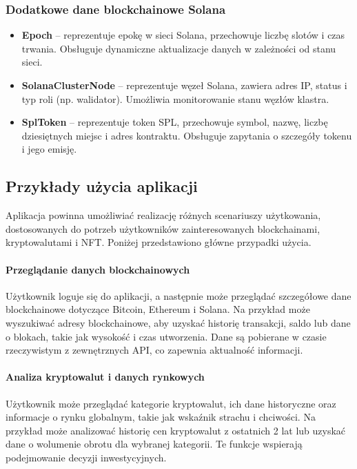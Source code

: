 \subsubsection{Dodatkowe dane blockchainowe Solana}
\begin{itemize}
\item \textbf{Epoch} -- reprezentuje epokę w sieci Solana, przechowuje liczbę slotów i czas trwania. Obsługuje dynamiczne aktualizacje danych w zależności od stanu sieci.
\item \textbf{SolanaClusterNode} -- reprezentuje węzeł Solana, zawiera adres IP, status i typ roli (np. walidator). Umożliwia monitorowanie stanu węzłów klastra.
\item \textbf{SplToken} -- reprezentuje token SPL, przechowuje symbol, nazwę, liczbę dziesiętnych miejsc i adres kontraktu. Obsługuje zapytania o szczegóły tokenu i jego emisję.
\end{itemize}

\subsection{Przykłady użycia aplikacji}
Aplikacja powinna umożliwiać realizację różnych scenariuszy użytkowania, dostosowanych do potrzeb użytkowników zainteresowanych blockchainami, kryptowalutami i NFT. Poniżej przedstawiono główne przypadki użycia.

\paragraph{Przeglądanie danych blockchainowych}
Użytkownik loguje się do aplikacji, a następnie może przeglądać szczegółowe dane blockchainowe dotyczące Bitcoin, Ethereum i Solana. Na przykład może wyszukiwać adresy blockchainowe, aby uzyskać historię transakcji, saldo lub dane o blokach, takie jak wysokość i czas utworzenia. Dane są pobierane w czasie rzeczywistym z zewnętrznych API, co zapewnia aktualność informacji.

\paragraph{Analiza kryptowalut i danych rynkowych}
Użytkownik może przeglądać kategorie kryptowalut, ich dane historyczne oraz informacje o rynku globalnym, takie jak wskaźnik strachu i chciwości. Na przykład może analizować historię cen kryptowalut z ostatnich 2 lat lub uzyskać dane o wolumenie obrotu dla wybranej kategorii. Te funkcje wspierają podejmowanie decyzji inwestycyjnych.

